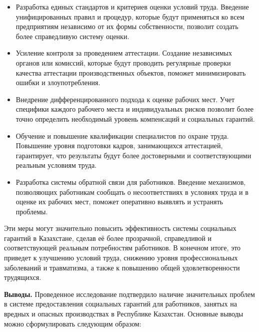 \begin{itemize}
\item
  Разработка единых стандартов и критериев оценки условий труда.
  Введение унифицированных правил и процедур, которые будут применяться
  ко всем предприятиям независимо от их формы собственности, позволит
  создать более справедливую систему оценки.
\item
  Усиление контроля за проведением аттестации. Создание независимых
  органов или комиссий, которые будут проводить регулярные проверки
  качества аттестации производственных объектов, поможет минимизировать
  ошибки и злоупотребления.
\item
  Внедрение дифференцированного подхода к оценке рабочих мест. Учет
  специфики каждого рабочего места и индивидуальных рисков позволит
  более точно определить необходимый уровень компенсаций и социальных
  гарантий.
\item
  Обучение и повышение квалификации специалистов по охране труда.
  Повышение уровня подготовки кадров, занимающихся аттестацией,
  гарантирует, что результаты будут более достоверными и
  соответствующими реальным условиям труда.
\item
  Разработка системы обратной связи для работников. Введение механизмов,
  позволяющих работникам сообщать о несоответствиях в условиях труда и в
  оценке их рабочих мест, поможет оперативно выявлять и устранять
  проблемы.
\end{itemize}

Эти меры могут значительно повысить эффективность системы социальных
гарантий в Казахстане, сделав её более прозрачной, справедливой и
соответствующей реальным потребностям работников. В конечном итоге, это
приведет к улучшению условий труда, снижению уровня профессиональных
заболеваний и травматизма, а также к повышению общей удовлетворенности
трудящихся.

{\bfseries Выводы.} Проведенное исследование подтвердило наличие
значительных проблем в системе предоставления социальных гарантий для
работников, занятых на вредных и опасных производствах в Республике
Казахстан. Основные выводы можно сформулировать следующим образом:

